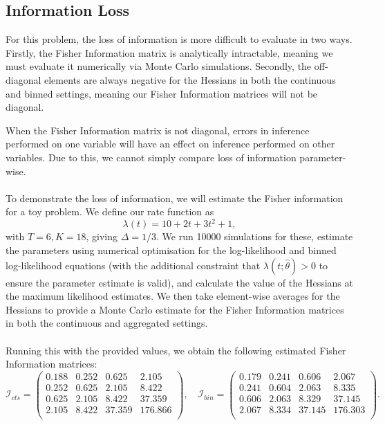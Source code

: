 \documentclass[11pt,a4,twosided,singlespacing,titlepagenumber=on,numbers=endperiod]{scrreprt}
\numberwithin{equation}{chapter} %
\theoremstyle{remark}
\begin{document}
\subsection{Information Loss}
For this problem, the loss of information is more difficult to evaluate in two ways. Firstly, the Fisher Information matrix is analytically intractable, meaning we must evaluate it numerically via Monte Carlo simulations. Secondly, the off-diagonal elements are always negative for the Hessians in both the continuous and binned settings, meaning our Fisher Information matrices will not be diagonal. 

When the Fisher Information matrix is not diagonal, errors in inference performed on one variable will have an effect on inference performed on other variables. Due to this, we cannot simply compare loss of information parameter-wise. \\\\
To demonstrate the loss of information, we will estimate the Fisher information for a toy problem. We define our rate function as
\begin{equation*}
	\lambda(t) = 10 + 2t + 3t^2 + 1,
\end{equation*}
with $T=6, K=18$, giving $\Delta=1/3$. We run 10000 simulations for these, estimate the parameters using numerical optimisation for the log-likelihood and binned log-likelihood equations (with the additional constraint that $\lambda(t; \hat{\theta}) > 0 $ to ensure the parameter estimate is valid), and calculate the value of the Hessians at the maximum likelihood estimates. We then take element-wise averages for the Hessians to provide a Monte Carlo estimate for the Fisher Information matrices in both the continuous and aggregated settings. \\\\
Running this with the provided values, we obtain the following estimated Fisher Information matrices:
\begin{equation*}
	\mathcal{I}_{cts} = \begin{pmatrix}
		0.188 & 0.252 & 0.625 & 2.105 \\
		0.252 & 0.625 & 2.105 & 8.422 \\
		0.625 & 2.105 & 8.422 & 37.359 \\
		2.105 & 8.422 & 37.359 & 176.866 \\
	\end{pmatrix}, \quad \mathcal{I}_{bin} = \begin{pmatrix}
		0.179 & 0.241 & 0.606 & 2.067 \\
		0.241 & 0.604 & 2.063 & 8.335 \\
		0.606 & 2.063 & 8.329 & 37.145 \\
		2.067 & 8.334 & 37.145 & 176.303 \\
	\end{pmatrix}.
\end{equation*}
\end{document}
